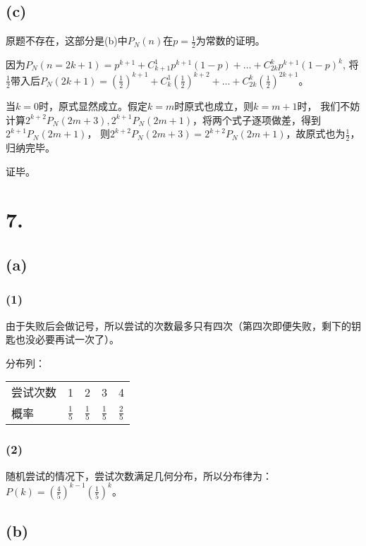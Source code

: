 \documentclass[UTF8]{report}
\begin{document}
        \subsection*{(c)}
            原题不存在，这部分是(b)中$P_N(n)$在$p = \frac{1}{2}$为常数的证明。

            因为$P_N(n = 2k + 1) = p^{k + 1} + C_{k + 1}^1p^{k+1}(1 - p) + \dots + C_{2k}^kp^{k + 1}(1 - p)^k$,
            将$\frac{1}{2}$带入后$P_N(2k + 1) = (\frac{1}{2})^{k + 1} + C_k^1(\frac{1}{2})^{k + 2} + \dots + C_{2k}^k(\frac{1}{2})^{2k + 1}$。
            
            当$k = 0$时，原式显然成立。假定$k = m$时原式也成立，则$k = m + 1$时，
            我们不妨计算$2^{k+2}P_N(2m + 3), 2^{k + 1}P_N(2m + 1)$，将两个式子逐项做差，得到$2^{k + 1}P_N(2m + 1)$，
            则$2^{k+2}P_N(2m + 3) = 2^{k + 2}P_N(2m + 1)$，故原式也为$\frac{1}{2}$，归纳完毕。

            证毕。
    \section*{7.}
        \subsection*{(a)}
            \subsubsection*{(1)}
                由于失败后会做记号，所以尝试的次数最多只有四次（第四次即便失败，剩下的钥匙也没必要再试一次了）。

                分布列：
                \begin{table}[!htbp]
                    \begin{tabular}{lllll}
                        尝试次数 & 1 & 2 & 3 & 4 \\
                        概率 & $\frac{1}{5}$ & $\frac{1}{5}$ & $\frac{1}{5}$ & $\frac{2}{5}$
                    \end{tabular}
                \end{table}
            \subsubsection*{(2)}
                随机尝试的情况下，尝试次数满足几何分布，所以分布律为：$P(k) = (\frac{4}{5})^{k - 1}(\frac{1}{5})^k$。
        \subsection*{(b)}
\end{document}
